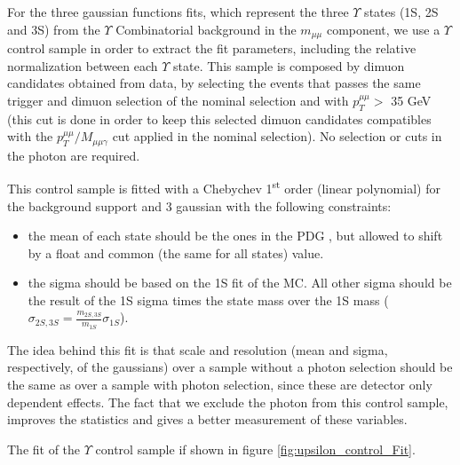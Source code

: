For the three gaussian functions fits, which represent the three $\Upsilon$ states (1S, 2S and 3S) from the $\Upsilon$ Combinatorial background in the $m_{\mu\mu}$ component, we use a $\Upsilon$ control sample in order to extract the fit parameters, including the relative normalization between each $\Upsilon$ state. This sample is composed by dimuon candidates obtained from data, by selecting the events that passes the same trigger and dimuon selection of the nominal selection and with $p_{T}^{\mu\mu} > $ 35 GeV (this cut is done in order to keep this selected dimuon candidates compatibles with the $p_{T}^{\mu\mu}/M_{\mu\mu\gamma}$ cut applied in the nominal selection). No selection or cuts in the photon are required.


This control sample is fitted with a Chebychev 1\textsuperscript{st} order (linear polynomial) for the background support and 3 gaussian with the following constraints:

\begin{itemize}
  \item the mean of each state should be the ones in the PDG \cite{pdg_2020}, but allowed to shift by a float and common (the same for all states) value.
  \item the sigma should be based on the 1S fit of the MC. All other sigma should be the result of the 1S sigma times the state mass over the 1S mass ($\sigma_{2S,3S} = \frac{m_{2S,3S}}{m_{1S}} \sigma_{1S}$).
\end{itemize}

The idea behind this fit is that scale and resolution (mean and sigma, respectively, of the gaussians) over a sample without a photon selection should be the same as over a sample with photon selection, since these are detector only dependent effects. The fact that we exclude the photon from this control sample, improves the statistics and gives a better measurement of these variables.

The fit of the $\Upsilon$ control sample if shown in figure \ref{fig:upsilon_control_Fit}.



